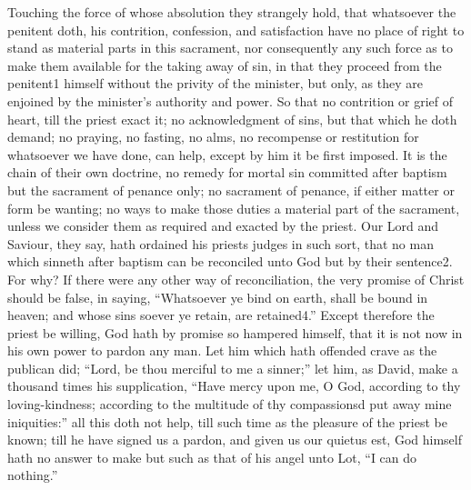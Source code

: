 Touching the force of whose absolution they strangely hold, that whatsoever the penitent doth, his contrition, confession, and satisfaction have no place of right to stand as material parts in this sacrament, nor consequently any such force as to make them available for the taking away of sin, in that they proceed from the penitent1 himself without the privity of the minister, but only, as they are enjoined by the minister’s authority and power. So that no contrition or grief of heart, till the priest exact it; no acknowledgment of sins, but that which he doth demand; no praying, no fasting, no alms, no recompense or restitution for whatsoever we have done, can help, except by him it be first imposed. It is the chain of their own doctrine, no remedy for mortal sin committed after baptism but the sacrament of penance only; no sacrament of penance, if either matter or form be wanting; no ways to make those duties a material part of the sacrament, unless we consider them as required and exacted by the priest. Our Lord and Saviour, they say, hath ordained his priests judges in such sort, that no man which sinneth after baptism can be reconciled unto God but by their sentence2. For why? If there were any other way of reconciliation, the very promise of Christ should be false, in saying, “Whatsoever ye bind on earth, shall be bound in heaven; and whose sins soever ye retain, are retained4.” Except therefore the priest be willing, God hath by promise so hampered himself, that it is not now in his own power to pardon any man. Let him which hath offended crave as the publican did; “Lord, be thou  merciful to me a sinner;” let him, as David, make a thousand times his supplication, “Have mercy upon me, O God, according to thy loving-kindness; according to the multitude of thy compassionsd put away mine iniquities:” all this doth not help, till such time as the pleasure of the priest be known; till he have signed us a pardon, and given us our quietus est, God himself hath no answer to make but such as that of his angel unto Lot, “I can do nothing.”

